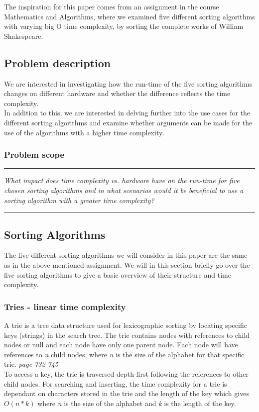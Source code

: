 
The inspiration for this paper comes from an assignment in the course Mathematics and Algorithms, where we examined five different sorting algorithms with varying big O time complexity, by sorting the complete works of William Shakespeare. \cite{mal3}

\vspace{0.5cm}
\subsection{Problem description}
\label{sec:1.1}
We are interested in investigating how the run-time of the five sorting algorithms changes on different hardware and whether the difference reflects the time complexity. \\In addition to this, we are interested in delving further into the use cases for the different sorting algorithms and examine whether arguments can be made for the use of the algorithms with a higher time complexity.

\subsubsection*{Problem scope}
\label{sec:1.1.1}
{\rule{\linewidth}{0.5mm}}
\emph{What impact does time complexity vs. hardware have on the run-time for five chosen sorting algorithms and in what scenarios would it be beneficial to use a sorting algorithm with a greater time complexity?}\\
{\rule{\linewidth}{0.5mm}}

\vspace{0.5cm}
\subsection{Sorting Algorithms}
\label{sec:1.2}
The five different sorting algorithms we will consider in this paper are the same as in the above-mentioned assignment.
We will in this section briefly go over the five sorting algorithms to give a basic overview of their structure and time complexity. 

\subsubsection*{Tries - linear time complexity}
\label{sec:1.2.1}
A trie is a  tree data structure used for lexicographic sorting by locating specific keys (strings) in the search tree. The trie contains nodes with references to child nodes or null and each node have only one parent node. Each node will have references to \emph{n} child nodes, where \emph{n} is the size of the alphabet for that specific trie. \cite{algo} \emph{page 732-745}
\\
To access a key, the trie is traversed depth-first following the references to other child nodes. For searching and inserting, the time complexity for a trie is dependant on characters stored in the trie and the length of the key which gives \(O(n * k)\) where \emph{n} is the size of the alphabet and \emph{k} is the length of the key.  \cite{tries} 

